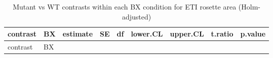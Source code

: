 \documentclass[
  10pt,
]{article}
\begin{document}
\begin{longtable}[]{@{}
  >{\raggedright\arraybackslash}p{}
  >{\raggedright\arraybackslash}p{}
  >{\raggedleft\arraybackslash}p{}
  >{\raggedleft\arraybackslash}p{}
  >{\raggedleft\arraybackslash}p{}
  >{\raggedleft\arraybackslash}p{}
  >{\raggedleft\arraybackslash}p{}
  >{\raggedleft\arraybackslash}p{}
  >{\raggedleft\arraybackslash}p{}@{}}
\caption{Mutant vs WT contrasts within each BX condition for ETI rosette
area (Holm-adjusted)}\tabularnewline
\toprule\noalign{}
\begin{minipage}[b]{\linewidth}\raggedright
contrast
\end{minipage} & \begin{minipage}[b]{\linewidth}\raggedright
BX
\end{minipage} & \begin{minipage}[b]{\linewidth}\raggedleft
estimate
\end{minipage} & \begin{minipage}[b]{\linewidth}\raggedleft
SE
\end{minipage} & \begin{minipage}[b]{\linewidth}\raggedleft
df
\end{minipage} & \begin{minipage}[b]{\linewidth}\raggedleft
lower.CL
\end{minipage} & \begin{minipage}[b]{\linewidth}\raggedleft
upper.CL
\end{minipage} & \begin{minipage}[b]{\linewidth}\raggedleft
t.ratio
\end{minipage} & \begin{minipage}[b]{\linewidth}\raggedleft
p.value
\end{minipage} \\
\midrule\noalign{}
\endfirsthead
\toprule\noalign{}
\begin{minipage}[b]{\linewidth}\raggedright
contrast
\end{minipage} & \begin{minipage}[b]{\linewidth}\raggedright
BX
\end{minipage} & \begin{minipage}[b]{\linewidth}\raggedleft

\end{minipage}
\end{longtable}
\end{document}
